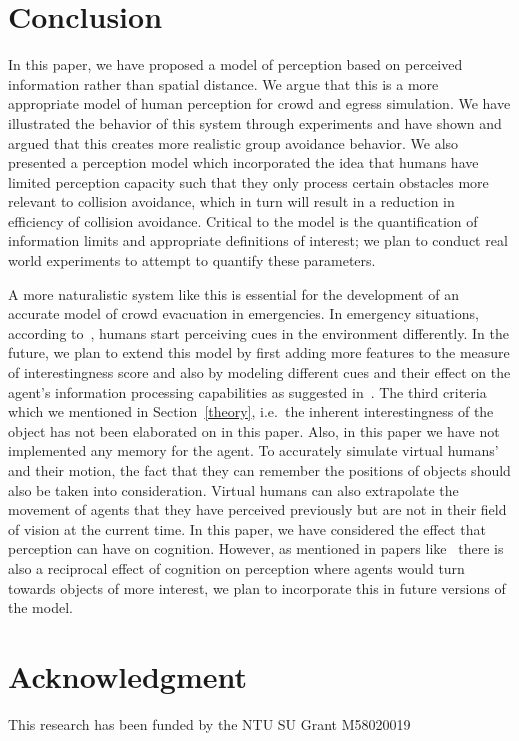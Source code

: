 \documentclass[runningheads,a4paper]{llncs}
\begin{document}
\section{Conclusion}
\label{Conclusion}
In this paper, we have proposed a model of perception based on perceived information rather than spatial distance. We argue that this is a more appropriate model of human perception for crowd and egress simulation. We have illustrated the behavior of this system through experiments and have shown and argued that this creates more realistic group avoidance behavior. We also presented a perception model which incorporated the idea that humans have limited perception capacity such that they only process certain obstacles more relevant to collision avoidance, which in turn will result in a reduction in efficiency of collision avoidance. Critical to the model is the quantification of information limits and appropriate definitions of interest; we plan to conduct real world experiments to attempt to quantify these parameters.

A more naturalistic system like this is essential for the development of an accurate model of crowd evacuation in emergencies. In emergency situations, according to~\cite{Ozel:2001tn}, humans start perceiving cues in the environment differently. In the future, we plan to extend this model by first adding more features to the measure of interestingness score and also by modeling different cues and their effect on the agent's information processing capabilities as suggested in~\cite{Kuligowski:2009un}. The third criteria which we mentioned in Section~\ref{theory}, i.e.\ the inherent interestingness of the object has not been elaborated on in this paper. Also, in this paper we have not implemented any memory for the agent. To accurately simulate virtual humans' and their motion, the fact that they can remember the positions of objects should also be taken into consideration. Virtual humans can also extrapolate the movement of agents that they have perceived previously but are not in their field of vision at the current time. In this paper, we have considered the effect that perception can have on cognition. However, as mentioned in papers like~\cite{Hill:1999ww} there is also a reciprocal effect of cognition on perception where agents would turn towards objects of more interest, we plan to incorporate this in future versions of the model.


\section*{Acknowledgment}
This research has been funded by the NTU SU Grant M58020019




\end{document}
